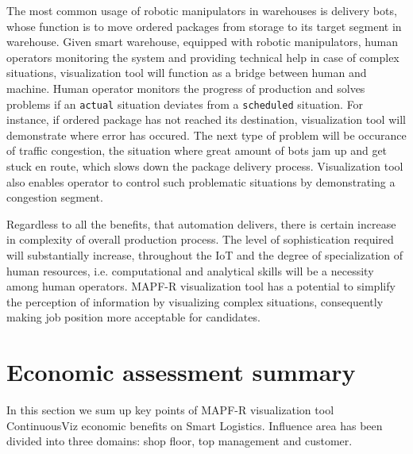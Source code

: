 \documentclass[thesis=B,english]{FITthesis}[2019/12/23]
\begin{document}
The most common usage of robotic manipulators in warehouses is delivery bots, whose function is to move ordered packages from storage to its target segment in warehouse. Given smart warehouse, equipped with robotic manipulators, human operators monitoring the system and providing technical help in case of complex situations, visualization tool will function as a bridge between human and machine. Human operator monitors the progress of production and solves problems if an \verb|actual| situation deviates from a \verb|scheduled| situation. For instance, if ordered package has not reached its destination, visualization tool will demonstrate where error has occured. The next type of problem will be occurance of traffic congestion, the situation where great amount of bots jam up and get stuck en route, which slows down the package delivery process. Visualization tool also enables operator to control such problematic situations by demonstrating a congestion segment.

Regardless to all the benefits, that automation delivers, there is certain increase in complexity of overall production process. The level of sophistication required will substantially increase, throughout the IoT and the degree of specialization of human resources, i.e. computational and analytical skills will be a necessity among human operators. MAPF-R visualization tool has a potential to simplify the perception of information by visualizing complex situations, consequently making job position more acceptable for candidates.


\section{Economic assessment summary}

In this section we sum up key points of MAPF-R visualization tool ContinuousViz economic benefits
on Smart Logistics. Influence area has been divided into three domains: shop floor, top management and customer.
\end{document}
